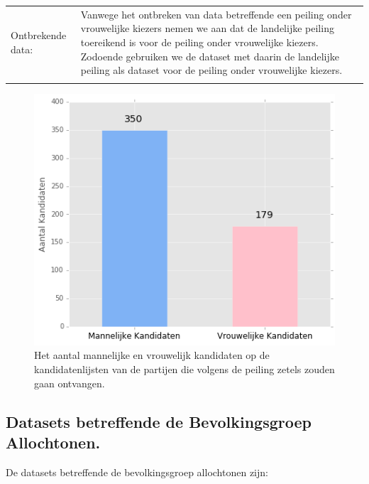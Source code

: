 \noindent\begin{tabularx}{\textwidth}{LI}
Ontbrekende data:  & Vanwege het ontbreken van data betreffende een peiling onder vrouwelijke kiezers nemen we aan dat de landelijke peiling toereikend is voor de peiling onder vrouwelijke kiezers. Zodoende gebruiken we de dataset met daarin de landelijke peiling als dataset voor de peiling onder vrouwelijke kiezers. \\
  \\
\end{tabularx}
\begin{figure}[H]
\centering
	\includegraphics[width=0.42\linewidth]{mv_kandidaten.png}

			\caption{Het aantal mannelijke en vrouwelijk kandidaten op de kandidatenlijsten \citep{Kiesraad_databank} van de partijen die volgens de peiling \citep{IPSOS} zetels zouden gaan ontvangen.}

\label{fig:mvKandidaten}
\end{figure}



\subsection{Datasets betreffende de Bevolkingsgroep Allochtonen.}
De datasets betreffende de bevolkingsgroep allochtonen zijn:\\



